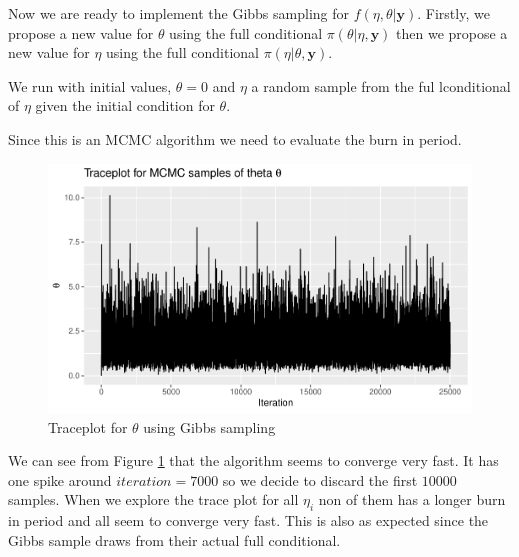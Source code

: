 

Now we are ready to implement the Gibbs sampling for $f(\eta, \theta | \boldsymbol{y})$. Firstly, we propose a new value for $\theta$ using the full conditional $\pi(\theta|\eta, \boldsymbol{y})$ then we propose a new value for $\eta$ using the full conditional $\pi(\eta|\theta, \boldsymbol{y})$. 



We run with initial values, $\theta = 0$ and $\eta$ a random sample from the ful lconditional of $\eta$ given the initial condition for $\theta$.



Since this is an MCMC algorithm we need to evaluate the burn in period. 

\begin{figure}[H]
    \centering
    \includegraphics[width = \textwidth]{Images/trace_theta_mcmc.pdf}
    \caption{Traceplot for $\theta$ using Gibbs sampling}
    \label{fig:trace_theta}
\end{figure}

We can see from Figure \ref{fig:trace_theta} that the algorithm seems to converge very fast. It has one spike around $iteration= 7000$ so we decide to discard the first $10 000$ samples. When we explore the trace plot for all $\eta_i$ non of them has a longer burn in period and all seem to converge very fast. This is also as expected since the Gibbs sample draws from their actual full conditional. 

